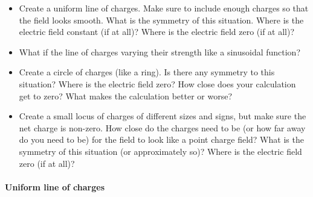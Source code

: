 \begin{itemize}
\tightlist
\item
  Create a uniform line of charges. Make sure to include enough charges
  so that the field looks smooth. What is the symmetry of this
  situation. Where is the electric field constant (if at all)? Where is
  the electric field zero (if at all)?
\item
  What if the line of charges varying their strength like a sinusoidal
  function?
\item
  Create a circle of charges (like a ring). Is there any symmetry to
  this situation? Where is the electric field zero? How close does your
  calculation get to zero? What makes the calculation better or worse?
\item
  Create a small locus of charges of different sizes and signs, but make
  sure the net charge is non-zero. How close do the charges need to be
  (or how far away do you need to be) for the field to look like a point
  charge field? What is the symmetry of this situation (or approximately
  so)? Where is the electric field zero (if at all)?
\end{itemize}

\paragraph{Uniform line of charges}\label{uniform-line-of-charges}

